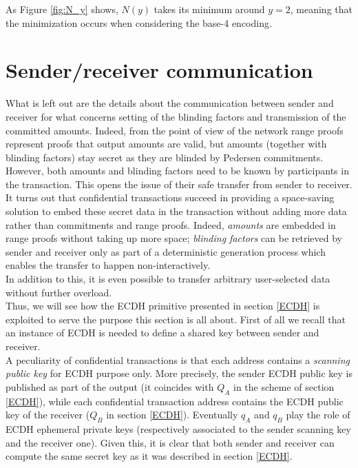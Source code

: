 As Figure \ref{fig:N_y} shows, $N(y)$ takes its minimum around $y=2$, meaning that the minimization occurs when considering the base-4 encoding.

\section{Sender/receiver communication}
What is left out are the details about the communication between sender and receiver for what concerns setting of the blinding factors and transmission of the committed amounts. Indeed, from the point of view of the network range proofs represent proofs that output amounts are valid, but amounts (together with blinding factors) stay secret as they are blinded by Pedersen commitments. However, both amounts and blinding factors need to be known by participants in the transaction. This opens the issue of their safe transfer from sender to receiver.\\
It turns out that confidential transactions succeed in providing a space-saving solution to embed these secret data in the transaction without adding more data rather than commitments and range proofs. Indeed, \textit{amounts} are embedded in range proofs without taking up more space; \textit{blinding factors} can be retrieved by sender and receiver only as part of a deterministic generation process which enables the transfer to happen non-interactively.\\
In addition to this, it is even possible to transfer arbitrary user-selected data without further overload.\\
Thus, we will see how the ECDH primitive presented in section \ref{ECDH} is exploited to serve the purpose this section is all about. First of all we recall that an instance of ECDH is needed to define a shared key between sender and receiver.\\
A peculiarity of confidential transactions is that each address contains a \textit{scanning public key} for ECDH purpose only. More precisely, the sender ECDH public key is published as part of the output (it coincides with $Q_A$ in the scheme of section \ref{ECDH}), while each confidential transaction address contains the ECDH public key of the receiver ($Q_B$ in section \ref{ECDH}). Eventually $q_A$ and $q_B$ play the role of ECDH ephemeral private keys (respectively associated to the sender scanning key and the receiver one). Given this, it is clear that both sender and receiver can compute the same secret key as it was described in section \ref{ECDH}.\\ 
